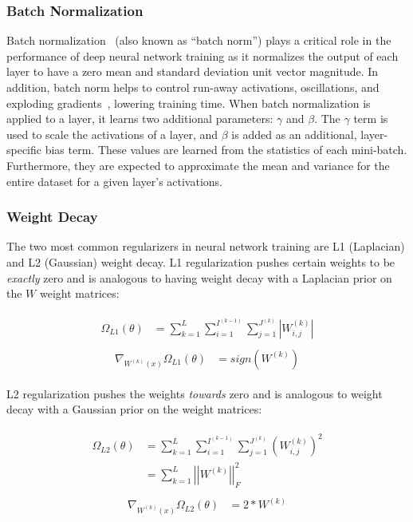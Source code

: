 \subsubsection{Batch Normalization}

Batch normalization~\cite{ioffe_batch_2015,ioffe_batch_2017} (also known as ``batch norm'') plays a critical role in the performance of deep neural network training as it normalizes the output of each layer to have a zero mean and standard deviation unit vector magnitude. In addition, batch norm helps to control run-away activations, oscillations, and exploding gradients~\cite{pascanu_understanding_2012}, lowering training time.  When batch normalization is applied to a layer, it learns two additional parameters: $\gamma$ and  $\beta$.  The $\gamma$ term is used to scale the activations of a layer, and $\beta$ is added as an additional, layer-specific bias term.  These values are learned from the statistics of each mini-batch.  Furthermore, they are expected to approximate the mean and variance for the entire dataset for a given layer's activations.

\subsubsection{Weight Decay}

The two most common regularizers in neural network training are L1 (Laplacian) and L2 (Gaussian) weight decay.  L1 regularization pushes certain weights to be \textit{exactly} zero and is analogous to having weight decay with a Laplacian prior on the $W$ weight matrices:

\begin{align}
    \begin{split}
        \Omega_{L1}(\theta) &= \sum_{k=1}^L \sum_{i=1}^{I^{(k-1)}} \sum_{j=1}^{J^{(k)}} \left | W_{i,j}^{(k)} \right |
    \end{split}
\end{align}
\begin{align}
    \begin{split}
        \nabla_{W^{(k)}(x)}\Omega_{L1}(\theta) &= sign(W^{(k)})
    \end{split}
\end{align}

\noindent L2 regularization pushes the weights \textit{towards} zero and is analogous to weight decay with a Gaussian prior on the weight matrices:

\begin{align}
    \begin{split}
        \Omega_{L2}(\theta) &= \sum_{k=1}^L \sum_{i=1}^{I^{(k-1)}} \sum_{j=1}^{J^{(k)}} \left ( W_{i,j}^{(k)} \right )^2 \\
        &= \sum_{k=1}^L \left| \left| W^{(k)} \right | \right |_F^2
    \end{split}
\end{align}
\begin{align}
    \begin{split}
        \nabla_{W^{(k)}(x)}\Omega_{L2}(\theta) &= 2*W^{(k)}
    \end{split}
\end{align}

